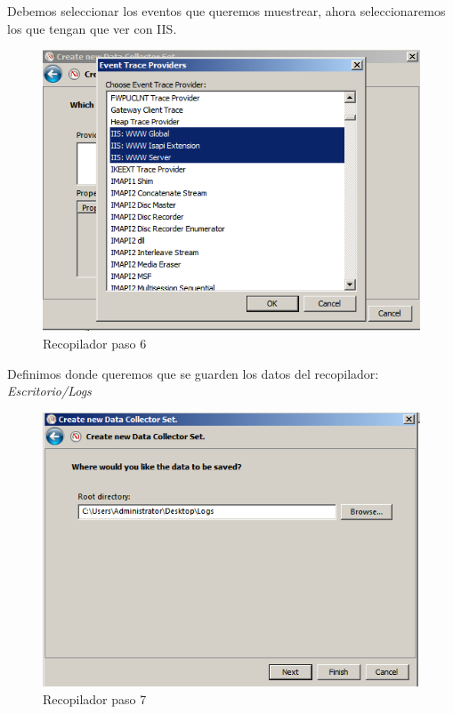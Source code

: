 Debemos seleccionar los eventos que queremos muestrear, ahora seleccionaremos los que tengan que ver con IIS.
\begin{figure}[H] %
	\centering
	\includegraphics[scale=0.5]{pics/recopilador6.png}  %
	\caption{Recopilador paso 6} \label{fig:reco6}
\end{figure}

Definimos donde queremos que se guarden los datos del recopilador: \textit{Escritorio/Logs}
\begin{figure}[H] %
	\centering
	\includegraphics[scale=0.5]{pics/recopilador7.png}  %
	\caption{Recopilador paso 7} \label{fig:reco7}
\end{figure}

